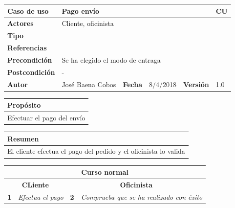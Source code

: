 \documentclass[12pt,spanish]{article}
\begin{document}
\begin{table}[H]
	\centering
	\begin{tabular}{|m{3cm}|m{4cm}|m{2cm}|m{2cm}|m{2cm}|m{1cm}|}
		\hline
		\textbf{Caso de uso} &  \multicolumn{4}{m{11cm}|}{Pago envío} \vline &  \cellcolor{gray!40}CU\arabic{contadorCU}  \stepcounter{contadorCU} \\
		\hline
		\textbf{Actores} & \multicolumn{5}{m{11cm}|}{Cliente, oficinista} \\
		\hline
		\textbf{Tipo} & \multicolumn{5}{m{11cm}|}{} \\
		\hline
		\textbf{Referencias} &\multicolumn{5}{m{11cm}|}{} \\
		\hline
		\textbf{Precondición} & \multicolumn{5}{m{11cm}|}{Se ha elegido el modo de entraga} \\
		\hline
		\textbf{Postcondición} & \multicolumn{5}{m{11cm}|}{-} \\
		\hline
		\textbf{Autor} & José Baena Cobos & \textbf{Fecha} & 8/4/2018 & \textbf{Versión} & 1.0 \\
		\hline
	\end{tabular}
	
	\vspace{1cm}
	
	\begin{tabular}{|m{16.2cm}|}
		\hline
		\textbf{Propósito} \\
		\hline
		Efectuar el pago del envío\\
		\hline
	\end{tabular}
	
	\vspace{1cm}
	
	\begin{tabular}{|m{16.2cm}|}
		\hline
		\textbf{Resumen} \\
		\hline
		El cliente efectua el pago del pedido y el oficinista lo valida\\
		\hline
	\end{tabular}
	
	\vspace{1cm}
	
	\begin{tabular}{|m{5pt}|m{7.33cm}|m{5pt}|m{7.33cm}|}
		\hline
		\multicolumn{4}{|c|}{\textbf{Curso normal}} \\
		\hline
		\multicolumn{2}{|c}{\textbf{CLiente}} & \multicolumn{2}{|c|}{\textbf{Oficinista}} \\
		\hline
		\textbf{1} & \textit{Efectua el pago} & \textbf{2} & \textit{Comprueba que se ha realizado con éxito} \\
		\hline
	

\end{tabular}
\end{table}
\end{document}
